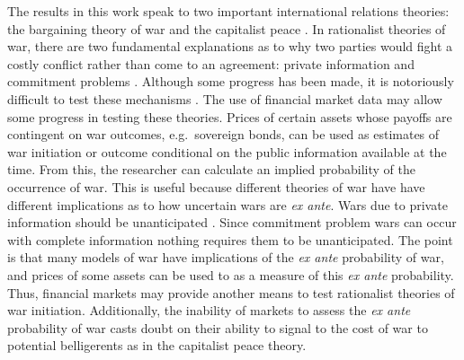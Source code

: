 \documentclass[]{article}\usepackage[]{graphicx}\usepackage[]{color}
\begin{document}
The results in this work speak to two important international relations theories: the bargaining theory of war \parencite{Fearon1995} and the capitalist peace \parencites{GartzkeLiEtAl2001a}{GartzkeLi2003}.
In rationalist theories of war, there are two fundamental explanations as to why two parties would fight a costly conflict rather than come to an agreement: private information and commitment problems \parencites{Fearon1995}{Powell2006}.
Although some progress has been made, it is notoriously difficult to test these mechanisms \parencite{Reiter2003}.
The use of financial market data may allow some progress in testing these theories.
Prices of certain assets whose payoffs are contingent on war outcomes, e.g.\ sovereign bonds, can be used as estimates of war initiation or outcome conditional on the public information available at the time.
From this, the researcher can calculate an implied probability of the occurrence of war.
This is useful because different theories of war have have different implications as to how uncertain wars are \textit{ex ante}.
Wars due to private information should be unanticipated \parencite{Gartzke1999}.
Since commitment problem wars can occur with complete information nothing requires them to be unanticipated.
The point is that many models of war have implications of the \textit{ex ante} probability of war, and prices of some assets can be used to as a measure of this \textit{ex ante} probability.
Thus, financial markets may provide another means to test rationalist theories of war initiation.
Additionally, the inability of markets to assess the \textit{ex ante} probability of war casts doubt on their ability to signal to the cost of war to potential belligerents as in the capitalist peace theory.
\end{document}
